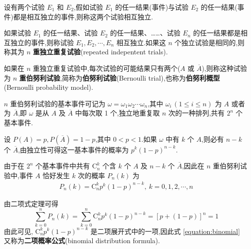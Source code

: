 \begin{definition}
    \indent 设有两个试验 $E_1$ 和 $E_2$,假如试验 $E_1$ 的任一结果(事件)与试验 $E_2$ 的任一结果(事件)都是相互独立的事件,则称这两个试验相互独立.
\end{definition}

\begin{definition}
    \indent 如果试验 $E_1$ 的任一结果、试验 $E_2$ 的任一结果、……、试验 $E_n$ 的任一结果都是相互独立的事件,则称试验 $E_1, E_2, \cdots, E_n$ 相互独立.如果这 $n$ 个独立试验是相同的,则称其为 $n$ \textbf{重独立重复试验}(repeated indepentent trials).
\end{definition}

\begin{definition}
    \indent 如果在 $n$ 重独立重复试验中,每次试验的可能结果只有两个($A$ 或 $\overline{A}$),则称这种试验为 $n$ \textbf{重伯努利试验},简称为\textbf{伯努利试验}(Bernoulli trial),也称为\textbf{伯努利概型}(Bernoulli probability model).
\end{definition}

$n$ 重伯努利试验的基本事件可记为 $\omega=\omega_1 \omega_2 \cdots \omega_n$,其中 $\omega_i\,(1\leqslant i\leqslant n)$ 为 $A$ 或者为 $\overline{A}$,即 $\omega$ 是从 $A$ 及 $\overline{A}$ 中每次取 1 个,独立地重复取 $n$ 次的一种排列,共有 $2^n$ 个基本事件.

设 $P(A)=p, P(\overline{A}) = 1-p$,其中 $0<p<1$.如果 $\omega$ 中有 $k$ 个 $A$,则必有 $n-k$ 个 $\overline{A}$,由独立性可得这一基本事件的概率为 $p^k (1-p)^{n-k}$.

由于在 $2^n$ 个基本事件中共有 $\mathrm{C}_n^k$ 个含 $k$ 个 $A$ 及 $n-k$ 个 $\overline{A}$,因此在 $n$ 重伯努利试验中,事件 $A$ 恰好发生 $k$ 次的概率 $P_n(k)$ 为
\begin{gather} \label{equation:binomial}
    P_n(k)=\mathrm{C}_n^k p^k (1-p)^{n-k}, \ k=0,1,2,\cdots,n
\end{gather}

由二项式定理可得
$$
\sum_{k=0}^n P_n(k) = \sum_{k=0}^n \mathrm{C}_n^k p^k (1-p)^{n-k} = [p+(1-p)]^n = 1
$$
由此可见, $\mathrm{C}_n^k p^k (1-p)^{n-k}$ 是二项展开式中的一项,因此式 \eqref{equation:binomial} 又称为\textbf{二项概率公式}(binomial distribution formula).